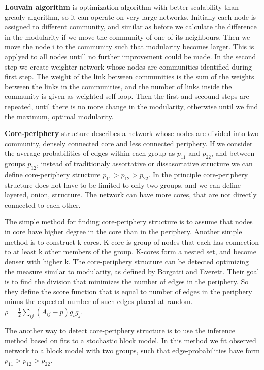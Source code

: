 \textbf{Louvain algorithm} is optimization algorithm with better scalability than gready algorithm, so it can operate on very large networks. Initially each node is assigned to different community, and similar as before we calculate the difference in the modularity if we move the community of one of its neighbours. Then we move the node i to the community such that modularity becomes larger. This is applyed to all nodes untill no further improvement could be made. In the second step we create weighter network whose nodes are communities identified during first step. The weight of the link between communities is the sum of the weights between the links in the communities, and the number of links inside the community is given as weighted self-loop. Then the first and secound steps are repeated, until there is no more change in the modularity, otherwise until we find the maximum, optimal modularity. 

\textbf{Core-periphery} structure describes a network whose nodes are divided into two community, densely connected core and less connected periphery. If we consider the average probabilities of edges within each group as $p_{11}$ and $p_{22}$, and between groups $p_{12}$, instead of traditionaly assortative or dissasortative structure we can define core-periphery structure $p_{11}> p_{12} > p_{22}$. In the principle core-periphery structure does not have to be limited to only two groups, and we can define layered, onion, structure. The network can have more cores, that are not directly connected to each other. 

The simple method for finding core-periphery structure is to assume that nodes in core have higher degree in the core than in the periphery. Another simple method is to construct k-cores. K core is group of nodes that each has connection to at least k other members of the group. K-cores form a nested set, and become denser with higher k. The core-periphery structure can be detected optimizing the measure similar to modularity, as defined by Borgatti and Everett. Their goal is to find the division that minimizes the number of edges in the periphery. So they define the score function that is equal to number of edges in the periphery minus the expected number of such edges placed at random. $\rho = \frac{1}{2}\sum_{ij}(A_{ij}-p)g_ig_j$.

The another way to detect core-periphery structure is to use the inference method based on fits to a stochastic block model. In this method we fit observed network to a block model with two groups, such that edge-probabilities have form $p_{11}> p_{12} > p_{22}$.

